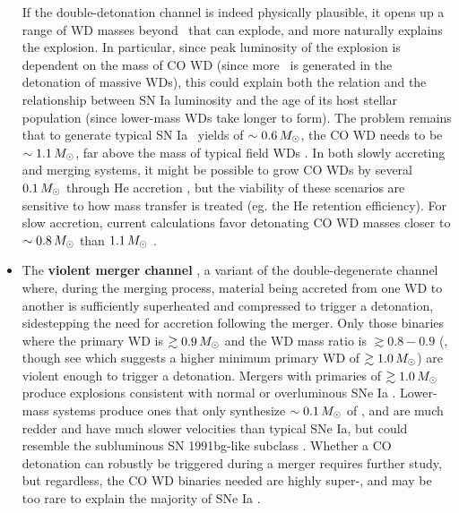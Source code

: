 \begin{itemize}
If the double-detonation channel is indeed physically plausible, it opens up a range of WD masses beyond \Mch\ that can explode, and more naturally explains the explosion.  In particular, since peak luminosity of the explosion is dependent on the mass of CO WD (since more \Ni\ is generated in the detonation of massive WDs), this could explain both the \cite{phil93} relation and the relationship between SN Ia luminosity and the age of its host stellar population (since lower-mass WDs take longer to form).  The problem remains that to generate typical SN Ia \Ni\ yields of $\sim0.6\,\Msun$, the CO WD needs to be $\sim1.1\,\Msun$, far above the mass of typical field WDs \citep{pirotk14}.  In both slowly accreting and merging systems, it might be possible to grow CO WDs by several $0.1\,\Msun$ through He accretion \citep{ruit+11, ruit+13, ruit+14}, but the viability of these scenarios are sensitive to how mass transfer is treated (eg. the He retention efficiency).  For slow accretion, current calculations favor detonating CO WD masses closer to $\sim0.8\,\Msun$ than $1.1\,\Msun$ \citep{ruit+14}.


	\item The {\bf violent merger channel} \citep{pakm+10}, a variant of the double-degenerate channel where, during the merging process, material being accreted from one WD to another is sufficiently superheated and compressed to trigger a detonation, sidestepping the need for accretion following the merger.  Only those binaries where the primary WD is $\gtrsim0.9\,\Msun$ and the WD mass ratio is $\gtrsim0.8-0.9$ (\citealt{pakm+10, pakm+11, sato+16}, though see \citealt{dan+12} which suggests a higher minimum primary WD of $\gtrsim1.0\,\Msun$) are violent enough to trigger a detonation.  Mergers with primaries of $\gtrsim1.0\,\Msun$ produce explosions consistent with normal or overluminous SNe Ia \citep{pakm+12, moll+14}.  Lower-mass systems produce ones that only synthesize $\sim0.1\,\Msun$ of \Ni, and are much redder and have much slower velocities than typical SNe Ia, but could resemble the subluminous SN 1991bg-like subclass \citep{lieb+93, pakm+10}.  Whether a CO detonation can robustly be triggered during a merger requires further study, but regardless, the CO WD binaries needed are highly super-\Mch, and may be too rare to explain the majority of SNe Ia \citep{badem12}.


\end{itemize}
